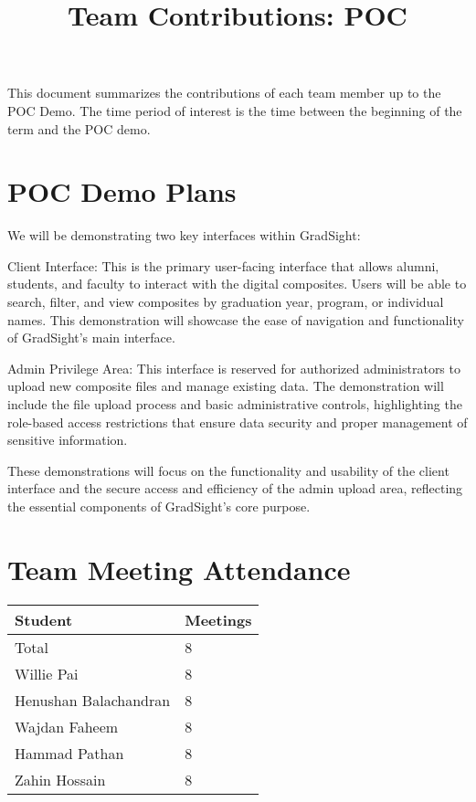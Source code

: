 \documentclass{article}
\title{Team Contributions: POC\\\progname}
\author{\authname}
\date{}
\begin{document}
\maketitle

This document summarizes the contributions of each team member up to the POC
Demo.  The time period of interest is the time between the beginning of the term
and the POC demo.

\section{POC Demo Plans}

We will be demonstrating two key interfaces within GradSight:

Client Interface: This is the primary user-facing interface that allows alumni, students, and faculty to interact with the digital composites. Users will be able to search, filter, and view composites by graduation year, program, or individual names. This demonstration will showcase the ease of navigation and functionality of GradSight’s main interface.

Admin Privilege Area: This interface is reserved for authorized administrators to upload new composite files and manage existing data. The demonstration will include the file upload process and basic administrative controls, highlighting the role-based access restrictions that ensure data security and proper management of sensitive information.

These demonstrations will focus on the functionality and usability of the client interface and the secure access and efficiency of the admin upload area, reflecting the essential components of GradSight’s core purpose.

\section{Team Meeting Attendance}

\begin{table}[H]
\centering
\begin{tabular}{ll}
\toprule
\textbf{Student} & \textbf{Meetings}\\
\midrule
Total & 8\\
Willie Pai & 8\\
Henushan Balachandran & 8\\
Wajdan Faheem & 8\\
Hammad Pathan & 8\\
Zahin Hossain & 8\\
\bottomrule
\end{tabular}
\end{table}
\end{document}
